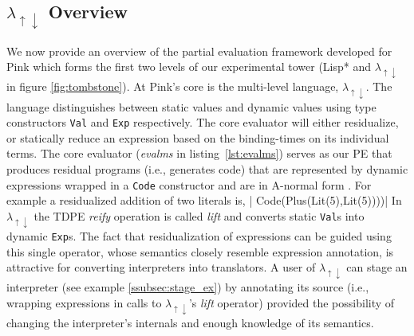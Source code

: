 \documentclass[a4paper,12pt,twoside,openright]{report}
\theoremstyle{definition}
\newcommand{\mslang}{$\lambda_{\uparrow\downarrow}$}
\begin{document}
%

\subsection{\texorpdfstring{\mslang}{Lg} Overview}\label{subsec:mslang}
We now provide an overview of the partial evaluation framework developed for Pink \cite{amin2017collapsing} which forms the first two levels of our experimental tower (Lisp* and \mslang{} in figure \ref{fig:tombstone}). At Pink's core is the multi-level language, \mslang{}. The language distinguishes between static values and dynamic values using type constructors \texttt{Val} and \texttt{Exp} respectively. The core evaluator will either residualize, or statically reduce an expression based on the binding-times on its individual terms. The core evaluator (\textit{evalms} in listing~\ref{lst:evalms}) serves as our PE that produces residual programs (i.e., generates code) that are represented by dynamic expressions wrapped in a \texttt{Code} constructor and are in A-normal form \cite{flanagan1993essence}. For example a residualized addition of two literals is,
|    Code(Plus(Lit(5),Lit(5))))|
In \mslang{} the TDPE \textit{reify} operation is called \textit{lift} and converts static \texttt{Val}s into dynamic \texttt{Exp}s. The fact that residualization of expressions can be guided using this single operator, whose semantics closely resemble expression annotation, is attractive for converting interpreters into translators. A user of \mslang{} can stage an interpreter (see example \ref{ssubsec:stage_ex}) by annotating its source (i.e., wrapping expressions in calls to \mslang{}'s \textit{lift} operator) provided the possibility of changing the interpreter's internals and enough knowledge of its semantics.
\end{document}
